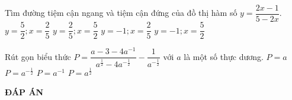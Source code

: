 \begin{ex}%
	Tìm đường tiệm cận ngang và tiệm cận đứng của đồ thị hàm số $y = \dfrac{2x - 1}{5 - 2x}$.
	\choice
	{$ y = \dfrac{5}{2}; x = \dfrac{2}{5}$}
	{$ y = \dfrac{2}{5}; x = \dfrac{5}{2}$}
	{$ y = -1 ; x = \dfrac{2}{5}$}
	{\True $ y = -1 ; x = \dfrac{5}{2}$}
\end{ex}

\begin{ex}%
	Rút gọn biểu thức $P = \dfrac{a - 3 - 4 a^{-1}}{a^{\frac{1}{2}} - 4 a ^{-\frac{1}{2}} }- \dfrac{1}{a^{-\frac{1}{2}}} $ với $a$ là một số thực dương.
	\choice
	{$P = a$}
	{\True $P  = a ^{-\frac{1}{2}}$}
	{$P = a^{-1}$}
	{$P = a^{\frac{1}{2}}$}
\end{ex}


\newpage
\begin{center}
	\textbf{ĐÁP ÁN}
\end{center}
\begin{multicols}{10}
	
\end{multicols}
